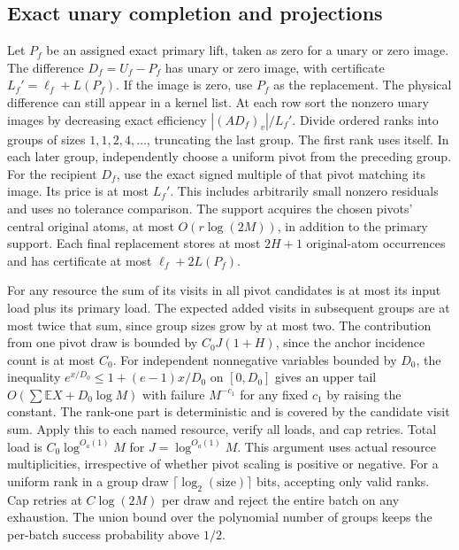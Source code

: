 \documentclass[11pt]{article}
\begin{document}
\hypertarget{exact-unary-completion-and-projections}{%
\subsection{Exact unary completion and projections}\label{exact-unary-completion-and-projections}}

Let \(P_f\) be an assigned exact primary lift, taken as zero for a unary or zero image. The difference \(D_f=U_f-P_f\) has unary or zero image, with certificate \(L_f'=\ell_f+L(P_f)\). If the image is zero, use \(P_f\) as the replacement. The physical difference can still appear in a kernel list. At each row sort the nonzero unary images by decreasing exact efficiency \(|(AD_f)_v|/L_f'\). Divide ordered ranks into groups of sizes \(1,1,2,4,\ldots\), truncating the last group. The first rank uses itself. In each later group, independently choose a uniform pivot from the preceding group. For the recipient \(D_f\), use the exact signed multiple of that pivot matching its image. Its price is at most \(L_f'\). This includes arbitrarily small nonzero residuals and uses no tolerance comparison. The support acquires the chosen pivots' central original atoms, at most \(O(r\log(2M))\), in addition to the primary support. Each final replacement stores at most \(2H+1\) original-atom occurrences and has certificate at most \(\ell_f+2L(P_f)\).

For any resource the sum of its visits in all pivot candidates is at most its input load plus its primary load. The expected added visits in subsequent groups are at most twice that sum, since group sizes grow by at most two. The contribution from one pivot draw is bounded by \(C_0 J(1+H)\), since the anchor incidence count is at most \(C_0\). For independent nonnegative variables bounded by \(D_0\), the inequality \(e^{x/D_0}\le1+(e-1)x/D_0\) on \([0,D_0]\) gives an upper tail \(O(\sum\mathbb E X+D_0\log M)\) with failure \(M^{-c_1}\) for any fixed \(c_1\) by raising the constant. The rank-one part is deterministic and is covered by the candidate visit sum. Apply this to each named resource, verify all loads, and cap retries. Total load is \(C_0\log^{O_a(1)}M\) for \(J=\log^{O_a(1)}M\). This argument uses actual resource multiplicities, irrespective of whether pivot scaling is positive or negative. For a uniform rank in a group draw \(\lceil\log_2(\text{size})\rceil\) bits, accepting only valid ranks. Cap retries at \(C\log(2M)\) per draw and reject the entire batch on any exhaustion. The union bound over the polynomial number of groups keeps the per-batch success probability above \(1/2\).
\end{document}
